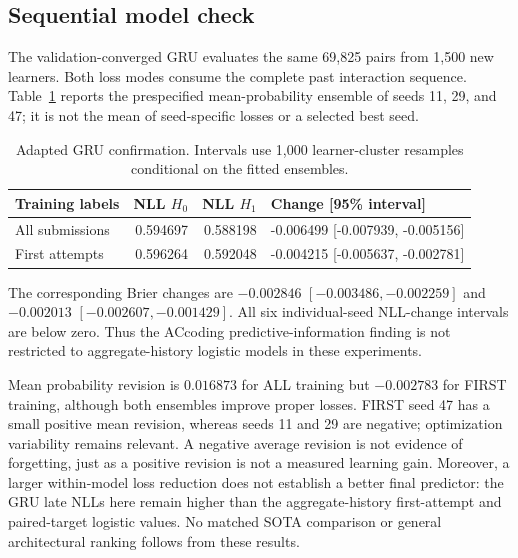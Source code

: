 \documentclass[11pt]{article}
\newcommand{\1}{\mathbb{I}}
\begin{document}
\subsection{Sequential model check}
The validation-converged GRU evaluates the same 69,825 pairs from 1,500 new learners. Both loss modes consume the complete past interaction sequence. Table~\ref{tab:gru} reports the prespecified mean-probability ensemble of seeds 11, 29, and 47; it is not the mean of seed-specific losses or a selected best seed.

\begin{table}[htbp]
\centering
\caption{Adapted GRU confirmation. Intervals use 1,000 learner-cluster resamples conditional on the fitted ensembles.}
\label{tab:gru}
\begin{tabular}{lrrl}
\toprule
Training labels & NLL $H_0$ & NLL $H_1$ & Change [95\% interval] \\
\midrule
All submissions & 0.594697 & 0.588198 & -0.006499 [-0.007939, -0.005156] \\
First attempts & 0.596264 & 0.592048 & -0.004215 [-0.005637, -0.002781] \\
\bottomrule
\end{tabular}
\end{table}

The corresponding Brier changes are $-0.002846$ $[-0.003486,-0.002259]$ and $-0.002013$ $[-0.002607,-0.001429]$. All six individual-seed NLL-change intervals are below zero. Thus the ACcoding predictive-information finding is not restricted to aggregate-history logistic models in these experiments.

Mean probability revision is $0.016873$ for ALL training but $-0.002783$ for FIRST training, although both ensembles improve proper losses. FIRST seed 47 has a small positive mean revision, whereas seeds 11 and 29 are negative; optimization variability remains relevant. A negative average revision is not evidence of forgetting, just as a positive revision is not a measured learning gain. Moreover, a larger within-model loss reduction does not establish a better final predictor: the GRU late NLLs here remain higher than the aggregate-history first-attempt and paired-target logistic values. No matched SOTA comparison or general architectural ranking follows from these results.
\end{document}
